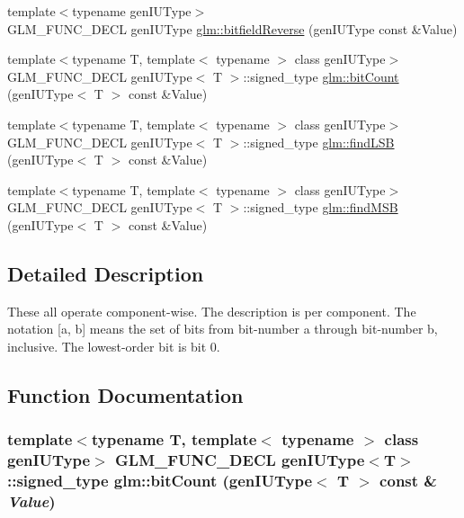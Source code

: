 \begin{CompactItemize}
\item 
{\footnotesize template$<$typename genIUType$>$ }\\GLM\_\-FUNC\_\-DECL genIUType \hyperlink{group__core__func__integer_ge55354ee3125593fc17f4cff052e6a10}{glm::bitfieldReverse} (genIUType const \&Value)
\item 
{\footnotesize template$<$typename T, template$<$ typename $>$ class genIUType$>$ }\\GLM\_\-FUNC\_\-DECL genIUType$<$ T $>$::signed\_\-type \hyperlink{group__core__func__integer_gccacb39d16885cc32fd8d5c95ab49da8}{glm::bitCount} (genIUType$<$ T $>$ const \&Value)
\item 
{\footnotesize template$<$typename T, template$<$ typename $>$ class genIUType$>$ }\\GLM\_\-FUNC\_\-DECL genIUType$<$ T $>$::signed\_\-type \hyperlink{group__core__func__integer_gdda1c11511dea60cd3f0b414d8baa9c2}{glm::findLSB} (genIUType$<$ T $>$ const \&Value)
\item 
{\footnotesize template$<$typename T, template$<$ typename $>$ class genIUType$>$ }\\GLM\_\-FUNC\_\-DECL genIUType$<$ T $>$::signed\_\-type \hyperlink{group__core__func__integer_g13ed58e71232a63dbc132b1be0f0ee9a}{glm::findMSB} (genIUType$<$ T $>$ const \&Value)
\end{CompactItemize}


\subsection{Detailed Description}
These all operate component-wise. The description is per component. The notation \mbox{[}a, b\mbox{]} means the set of bits from bit-number a through bit-number b, inclusive. The lowest-order bit is bit 0. 

\subsection{Function Documentation}
\hypertarget{group__core__func__integer_gccacb39d16885cc32fd8d5c95ab49da8}{
\subsubsection[bitCount]{\setlength{\rightskip}{0pt plus 5cm}template$<$typename T, template$<$ typename $>$ class genIUType$>$ GLM\_\-FUNC\_\-DECL genIUType$<$T$>$::signed\_\-type glm::bitCount (genIUType$<$ T $>$ const \& {\em Value})}}
\label{group__core__func__integer_gccacb39d16885cc32fd8d5c95ab49da8}


